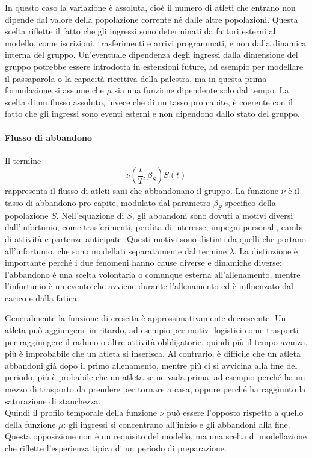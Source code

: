 In questo caso la variazione è assoluta, cioè il numero di atleti che entrano non dipende dal valore della popolazione corrente né dalle altre popolazioni. Questa scelta riflette il fatto che gli ingressi sono determinati da fattori esterni al modello, come iscrizioni, trasferimenti e arrivi programmati, e non dalla dinamica interna del gruppo. Un'eventuale dipendenza degli ingressi dalla dimensione del gruppo potrebbe essere introdotta in estensioni future, ad esempio per modellare il passaparola o la capacità ricettiva della palestra, ma in questa prima formulazione si assume che $\mu$ sia una funzione dipendente solo dal tempo. La scelta di un flusso assoluto, invece che di un tasso pro capite, è coerente con il fatto che gli ingressi sono eventi esterni e non dipendono dallo stato del gruppo.

\paragraph{Flusso di abbandono}
Il termine
\[
    \nu\left(\frac{t}{T}, \beta_S\right) S(t)
\]
rappresenta il flusso di atleti sani che abbandonano il gruppo. La funzione $\nu$ è il tasso di abbandono pro capite, modulato dal parametro $\beta_S$ specifico della popolazione $S$. Nell'equazione di $S$, gli abbandoni sono dovuti a motivi diversi dall'infortunio, come trasferimenti, perdita di interesse, impegni personali, cambi di attività e partenze anticipate. Questi motivi sono distinti da quelli che portano all'infortunio, che sono modellati separatamente dal termine $\lambda$. La distinzione è importante perché i due fenomeni hanno cause diverse e dinamiche diverse: l'abbandono è una scelta volontaria o comunque esterna all'allenamento, mentre l'infortunio è un evento che avviene durante l'allenamento ed è influenzato dal carico e dalla fatica. \par

Generalmente la funzione di crescita è approssimativamente decrescente. Un atleta può aggiungersi in ritardo, ad esempio per motivi logistici come trasporti per raggiungere il raduno o altre attività obbligatorie, quindi più il tempo avanza, più è improbabile che un atleta si inserisca. Al contrario, è difficile che un atleta abbandoni già dopo il primo allenamento, mentre più ci si avvicina alla fine del periodo, più è probabile che un atleta se ne vada prima, ad esempio perché ha un mezzo di trasporto da prendere per tornare a casa, oppure perché ha raggiunto la saturazione di stanchezza. \\
Quindi il profilo temporale della funzione $\nu$ può essere l'opposto rispetto a quello della funzione $\mu$: gli ingressi si concentrano all'inizio e gli abbandoni alla fine. Questa opposizione non è un requisito del modello, ma una scelta di modellazione che riflette l'esperienza tipica di un periodo di preparazione. \par

